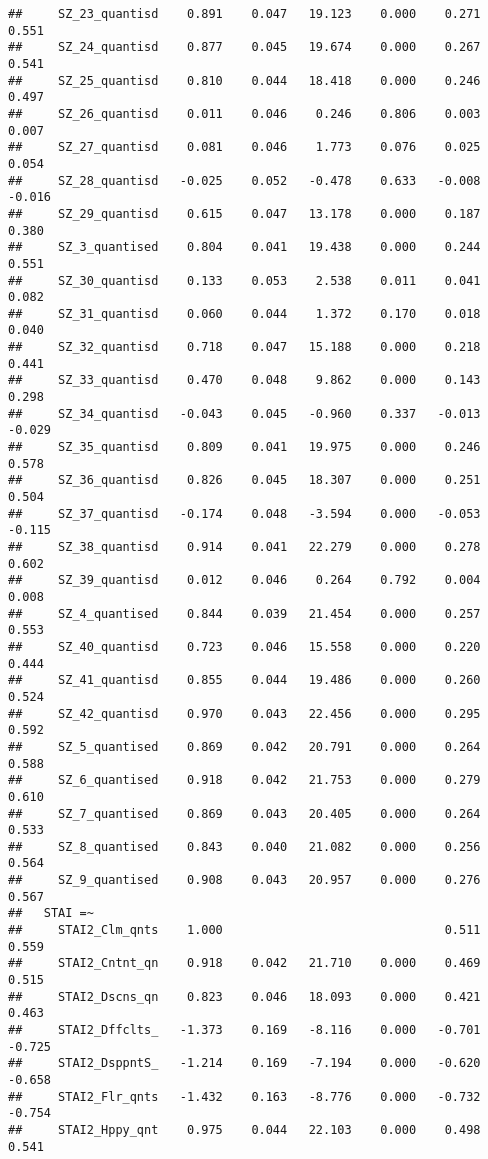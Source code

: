 \documentclass[]{article}
\begin{document}
\begin{verbatim}
##     SZ_23_quantisd    0.891    0.047   19.123    0.000    0.271    0.551
##     SZ_24_quantisd    0.877    0.045   19.674    0.000    0.267    0.541
##     SZ_25_quantisd    0.810    0.044   18.418    0.000    0.246    0.497
##     SZ_26_quantisd    0.011    0.046    0.246    0.806    0.003    0.007
##     SZ_27_quantisd    0.081    0.046    1.773    0.076    0.025    0.054
##     SZ_28_quantisd   -0.025    0.052   -0.478    0.633   -0.008   -0.016
##     SZ_29_quantisd    0.615    0.047   13.178    0.000    0.187    0.380
##     SZ_3_quantised    0.804    0.041   19.438    0.000    0.244    0.551
##     SZ_30_quantisd    0.133    0.053    2.538    0.011    0.041    0.082
##     SZ_31_quantisd    0.060    0.044    1.372    0.170    0.018    0.040
##     SZ_32_quantisd    0.718    0.047   15.188    0.000    0.218    0.441
##     SZ_33_quantisd    0.470    0.048    9.862    0.000    0.143    0.298
##     SZ_34_quantisd   -0.043    0.045   -0.960    0.337   -0.013   -0.029
##     SZ_35_quantisd    0.809    0.041   19.975    0.000    0.246    0.578
##     SZ_36_quantisd    0.826    0.045   18.307    0.000    0.251    0.504
##     SZ_37_quantisd   -0.174    0.048   -3.594    0.000   -0.053   -0.115
##     SZ_38_quantisd    0.914    0.041   22.279    0.000    0.278    0.602
##     SZ_39_quantisd    0.012    0.046    0.264    0.792    0.004    0.008
##     SZ_4_quantised    0.844    0.039   21.454    0.000    0.257    0.553
##     SZ_40_quantisd    0.723    0.046   15.558    0.000    0.220    0.444
##     SZ_41_quantisd    0.855    0.044   19.486    0.000    0.260    0.524
##     SZ_42_quantisd    0.970    0.043   22.456    0.000    0.295    0.592
##     SZ_5_quantised    0.869    0.042   20.791    0.000    0.264    0.588
##     SZ_6_quantised    0.918    0.042   21.753    0.000    0.279    0.610
##     SZ_7_quantised    0.869    0.043   20.405    0.000    0.264    0.533
##     SZ_8_quantised    0.843    0.040   21.082    0.000    0.256    0.564
##     SZ_9_quantised    0.908    0.043   20.957    0.000    0.276    0.567
##   STAI =~                                                               
##     STAI2_Clm_qnts    1.000                               0.511    0.559
##     STAI2_Cntnt_qn    0.918    0.042   21.710    0.000    0.469    0.515
##     STAI2_Dscns_qn    0.823    0.046   18.093    0.000    0.421    0.463
##     STAI2_Dffclts_   -1.373    0.169   -8.116    0.000   -0.701   -0.725
##     STAI2_DsppntS_   -1.214    0.169   -7.194    0.000   -0.620   -0.658
##     STAI2_Flr_qnts   -1.432    0.163   -8.776    0.000   -0.732   -0.754
##     STAI2_Hppy_qnt    0.975    0.044   22.103    0.000    0.498    0.541

\end{verbatim}
\end{document}

